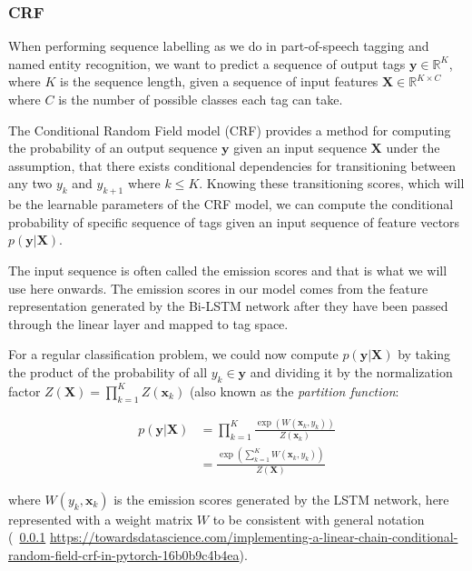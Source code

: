 



\subsubsection{CRF}

When performing sequence labelling as we do in part-of-speech tagging and named
entity recognition, we want to predict a sequence of output tags $\bm{y} \in
\mathbb{R}^{K}$, where $K$ is the sequence length, given a sequence of input
features $\bm{X} \in \mathbb{R}^{K \times C}$ where $C$ is the number of
possible classes each tag can take.

The Conditional Random Field model (CRF) provides a method for computing the
probability of an output sequence $\bm{y}$ given an input sequence $\bm{X}$
under the assumption, that there exists conditional dependencies for
transitioning between any two $y_{k}$ and $y_{k+1}$ where $k \leq K$. Knowing these
transitioning scores, which will be the learnable parameters of the CRF model,
we can compute the conditional probability of specific sequence of tags given an
input sequence of feature vectors $p(\bm{y}|\bm{X})$.

The input sequence is often called the emission scores and that is what we will
use here onwards. The emission scores in our model comes from the feature
representation generated by the Bi-LSTM network after they have been passed
through the linear layer and mapped to tag space. 

For a regular classification problem, we could now compute $p(\bm{y}|\bm{X})$ by
taking the product of the probability of all $y_{k} \in \bm{y}$ and dividing it
by the normalization factor $Z(\bm{X}) = \prod_{k=1}^{K} Z(\bm{x}_{k})$ (also
known as the \textit{partition function}:

\begin{align*}
p(\bm{y}|\bm{X}) & = \prod_{k=1}^{K} \frac{\exp( W(\bm{x}_{k}, y_{k}) )} 
                                            {Z(\bm{x}_{k})} \\
                 & = \frac{\exp( \sum_{k=1}^{K} W(\bm{x}_k, y_{k}) )}
                                            {Z(\bm{X})}
\end{align*}

where $W(y_{k}, \bm{x}_{k})$ is the emission scores generated by the LSTM
network, here represented with a weight matrix $W$ to be consistent with general
notation (~\ref{}
\url{https://towardsdatascience.com/implementing-a-linear-chain-conditional-random-field-crf-in-pytorch-16b0b9c4b4ea}).

